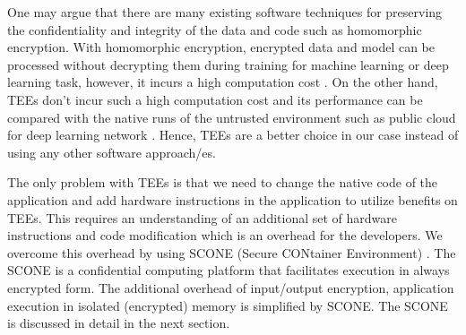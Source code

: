 One may argue that there are many existing software techniques for preserving the confidentiality and integrity of the data and code such as homomorphic encryption. With homomorphic encryption, encrypted data and model can be processed without decrypting them during training for machine learning or deep learning task, however, it incurs a high computation cost \cite{50} \cite{51}. On the other hand, TEEs don't incur such a high computation cost and its performance can be compared with the native runs of the untrusted environment such as public cloud for deep learning network \cite{52} \cite{53}. Hence, TEEs are a better choice in our case instead of using any other software approach/es.

The only problem with TEEs is that we need to change the native code of the application and add hardware instructions in the application to utilize benefits on TEEs. This requires an understanding of an additional set of hardware instructions and code modification which is an overhead for the developers. We overcome this overhead by using SCONE (Secure CONtainer Environment) \cite{22}. The SCONE is a confidential computing platform that facilitates execution in always encrypted form. The additional overhead of input/output encryption, application execution in isolated (encrypted) memory is simplified by SCONE. The SCONE is discussed in detail in the next section.

